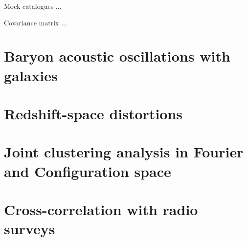 Mock catalogues ... 

Covariance matrix ...  

\section{Baryon acoustic oscillations with galaxies}
\label{galaxies:bao}




\section{Redshift-space distortions}
\label{galaxies:rsd}

\section{Joint clustering analysis in Fourier and Configuration space}
\label{galaxies:joint}


\section{Cross-correlation with radio surveys}
\label{galaxies:radio}

